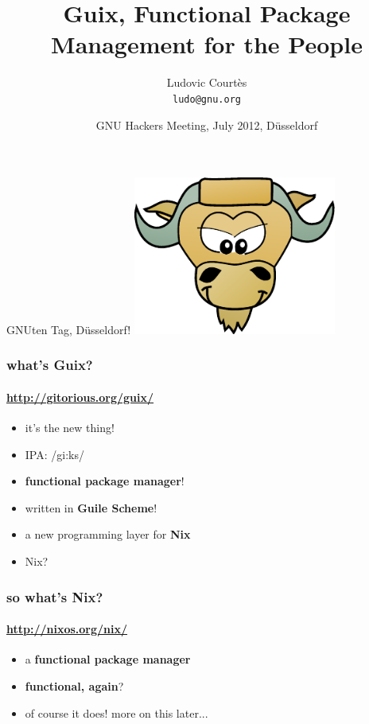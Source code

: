 \documentclass{beamer}
\title[]{Guix, Functional Package Management for the People}
\author{Ludovic Courtès\\\texttt{ludo@gnu.org}}
\date{\small{GNU Hackers Meeting, July 2012, Düsseldorf}}
\begin{document}
\maketitle

\begin{frame}{GNUten Tag, Düsseldorf!}
  \includegraphics[width=0.5\textwidth]{images/guile-white}
\end{frame}

\begin{frame}
  \frametitle{what's Guix?}
  \framesubtitle{\url{http://gitorious.org/guix/}}

  \begin{itemize}
  \item<1-> it's the new thing!
  \item<1-> IPA: /\textrm{gi:ks}/ %
  \item<2-> \textbf{functional package manager}!
  \item<3-> written in \textbf{Guile Scheme}!
  \item<4-> a new programming layer for \textbf{Nix}
  \item<5-> Nix?
  \end{itemize}
\end{frame}

\begin{frame}
  \frametitle{so what's Nix?}
  \framesubtitle{\url{http://nixos.org/nix/}}

  \begin{itemize}
  \item a \textbf{functional package manager}
  \item<2-> \textbf{functional, again}? 
  \item<4-> of course it does!  more on this later...
  \end{itemize}
\end{frame}
\end{document}
